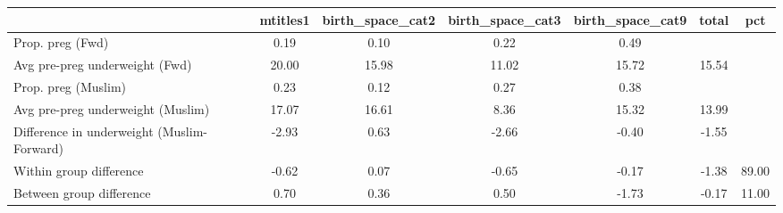 \begin{tabular}{l*{6}{c}}
\toprule
            &\multicolumn{1}{c}{mtitles1}&\multicolumn{1}{c}{birth\_space\_cat2}&\multicolumn{1}{c}{birth\_space\_cat3}&\multicolumn{1}{c}{birth\_space\_cat9}&\multicolumn{1}{c}{total}&\multicolumn{1}{c}{pct}\\
\midrule
\midrule
Prop. preg (Fwd)&        0.19&        0.10&        0.22&        0.49&            &            \\
Avg pre-preg underweight (Fwd)&       20.00&       15.98&       11.02&       15.72&       15.54&            \\
Prop. preg (Muslim)&        0.23&        0.12&        0.27&        0.38&            &            \\
Avg pre-preg underweight (Muslim)&       17.07&       16.61&        8.36&       15.32&       13.99&            \\
Difference in underweight (Muslim-Forward)&       -2.93&        0.63&       -2.66&       -0.40&       -1.55&            \\
Within group difference&       -0.62&        0.07&       -0.65&       -0.17&       -1.38&       89.00\\
Between group difference&        0.70&        0.36&        0.50&       -1.73&       -0.17&       11.00\\
\bottomrule
\end{tabular}
